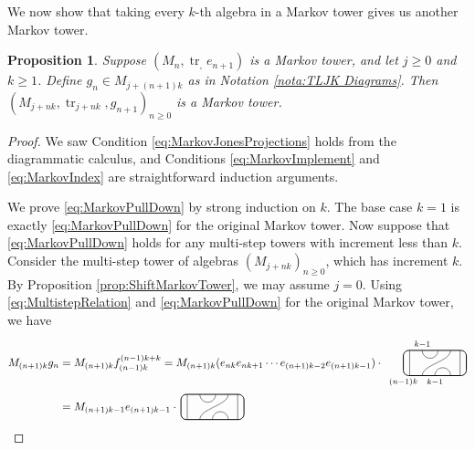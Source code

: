 \documentclass[11pt]{article}
\theoremstyle{plain}
\newtheorem{prop}[thm]{Proposition}
\theoremstyle{definition}
\DeclareMathOperator{\tr}{tr}
\begin{document}
We now show that taking every $k$-th algebra in a Markov tower gives us another Markov tower.

\begin{prop}
\label{prop:MultistepJonesProjections}
Suppose $(M_n, \tr_, e_{n+1})$ is a Markov tower, and let $j\geq 0$ and $k\geq 1$.
Define $g_n \in M_{j+(n+1)k}$ as in Notation \ref{nota:TLJK Diagrams}.
Then $(M_{j+nk}, \tr_{j+nk}, g_{n+1})_{n\geq 0}$ is a Markov tower.
\end{prop}
\begin{proof}
We saw Condition \ref{eq:MarkovJonesProjections} holds from the diagrammatic calculus, and Conditions \ref{eq:MarkovImplement} and \ref{eq:MarkovIndex} are straightforward induction arguments.

We prove \ref{eq:MarkovPullDown} by strong induction on $k$.
The base case $k=1$ is exactly \ref{eq:MarkovPullDown} for the original Markov tower.
Now suppose that \ref{eq:MarkovPullDown} holds for any multi-step towers with increment less than $k$.
Consider the multi-step tower of algebras $(M_{j+nk})_{n\geq 0}$, which has increment $k$.
By Proposition \ref{prop:ShiftMarkovTower}, we may assume $j=0$.
Using \eqref{eq:MultistepRelation} and \ref{eq:MarkovPullDown} for the original Markov tower, we have 
\begin{align*}
M_{(n+1)k} g_n 
&= 
M_{(n+1)k} f^{(n-1)k+k}_{(n-1)k} 
= 
M_{(n+1)k}
(e_{nk}e_{nk+1}\cdots e_{(n+1)k-2}e_{(n+1)k-1})
\cdot\,
\begin{tikzpicture}[baseline = .3cm]
 \draw[thick, rounded corners = 5pt] (0,0) rectangle (2,.8);
 \draw (.2,0) -- (.2,.8);
 \draw (1.8,0) -- (1.8,.8);
 \draw (.6,.8) arc (-180:0:.25cm);
 \draw (.6,0)  .. controls ++(90:.35cm) and ++(270:.35cm) .. (1.5,.8);
 \draw (1,0) arc (180:0:.25cm);
 \node at (.6,1) {\scriptsize{$k{-}1$}};
 \node at (1,-.2) {\scriptsize{$k{-}1$}};
 \node at (0,-.2) {\scriptsize{$(n{-}1)k$}};
\end{tikzpicture}
\\&=
M_{(n+1)k-1} 
e_{(n+1)k-1}
\cdot \,
\begin{tikzpicture}[baseline = .3cm]
 \draw[thick, rounded corners = 5pt] (0,0) rectangle (2,.8);
 \draw (.2,0) -- (.2,.8);
 \draw (1.8,0) -- (1.8,.8);
 \draw (.6,.8) arc (-180:0:.25cm);
 \draw (.6,0)  .. controls ++(90:.35cm) and ++(270:.35cm) .. (1.5,.8);
 \draw (1,0) arc (180:0:.25cm);

\end{tikzpicture}
\end{align*}
\end{proof}
\end{document}
